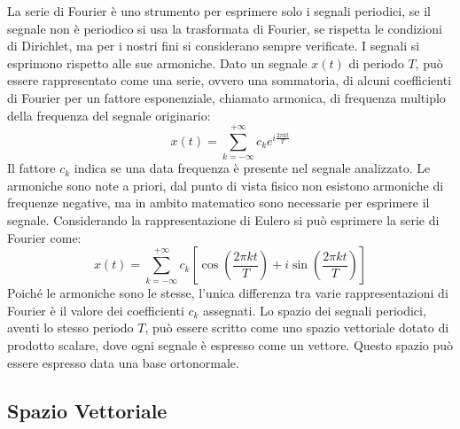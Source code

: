\documentclass{article}
\numberwithin{equation}{subsection}
\begin{document}
La serie di Fourier è uno strumento per esprimere solo i segnali periodici, 
se il segnale non è periodico si usa la trasformata di Fourier, se rispetta le condizioni di Dirichlet, ma per i nostri fini si considerano sempre verificate. 
I segnali si esprimono rispetto alle sue armoniche. Dato un segnale $x(t)$ di periodo $T$, può essere rappresentato come una serie, ovvero una sommatoria, di alcuni 
coefficienti di Fourier per un fattore esponenziale, chiamato armonica, di frequenza multiplo della frequenza del segnale originario:
\begin{equation*}
    x(t)=\displaystyle\sum_{k=-\infty}^{+\infty}c_ke^{i\frac{2\pi  k t}{T}}
\end{equation*}
Il fattore $c_k$ indica se una data frequenza è presente nel segnale analizzato. Le armoniche sono note a priori, dal punto di vista fisico non esistono armoniche di frequenze 
negative, ma in ambito matematico sono necessarie per esprimere il segnale. Considerando la rappresentazione di Eulero si può esprimere la serie di Fourier come:
\begin{equation*}
    x(t)=\displaystyle\sum_{k=-\infty}^{+\infty}c_k\left[\cos\left(\frac{2\pi k t}{T}\right)+i\sin\left(\frac{2\pi k t}{T}\right)\right]
\end{equation*}
Poiché le armoniche sono le stesse, l'unica differenza tra varie rappresentazioni di Fourier è il valore dei coefficienti $c_k$ assegnati. Lo spazio dei segnali periodici, 
aventi lo stesso periodo $T$, può essere scritto come uno spazio vettoriale dotato di prodotto scalare, dove ogni segnale è espresso come un vettore. Questo spazio può essere 
espresso data una base ortonormale.

\subsection{Spazio Vettoriale}
\end{document}
